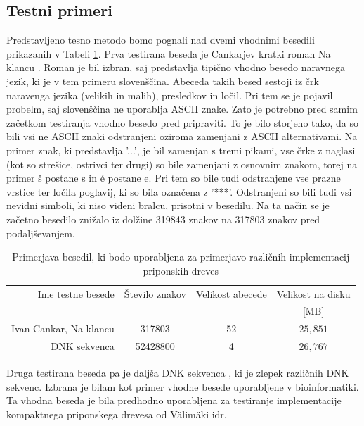 \subsection{Testni primeri}

Predstavljeno tesno metodo bomo pognali nad dvemi vhodnimi besedili prikazanih v Tabeli \ref{tab:besedila}. Prva testirana beseda je Cankarjev kratki roman Na klancu \cite{podatkiNaKlancu}. Roman je bil izbran, saj predstavlja tipično vhodno besedo naravnega jezik, ki je v tem primeru slovenščina. Abeceda takih besed sestoji iz črk naravenga jezika (velikih in malih), presledkov in ločil. Pri tem se je pojavil probelm, saj slovenščina ne uporablja ASCII znake. Zato je potrebno pred samim začetkom testiranja vhodno besedo pred pripraviti. To je bilo storjeno tako, da so bili vsi ne ASCII znaki odstranjeni oziroma zamenjani z ASCII alternativami. Na primer znak, ki predstavlja '...', je bil zamenjan s tremi pikami, vse črke z naglasi (kot so strešice, ostrivci ter drugi) so bile zamenjani z osnovnim znakom, torej na primer š postane s in é postane e. Pri tem so bile tudi odstranjene vse prazne vrstice ter ločila poglavij, ki so bila označena z '***'. Odstranjeni so bili tudi vsi nevidni simboli, ki niso videni bralcu, prisotni v besedilu. Na ta način se je začetno besedilo znižalo iz dolžine 319843 znakov na 317803 znakov pred podaljševanjem.

\begin{table}[htb]
    \caption{Primerjava besedil, ki bodo uporabljena za primerjavo različnih implementacij priponskih dreves}
    \label{tab:besedila}
    \centering
    \begin{tabular}{rccc}
        Ime testne besede& Število znakov & Velikost abecede & Velikost na disku \\
        &  &   & [MB]\\
         \hline
        Ivan Cankar, Na klancu \cite{podatkiNaKlancu}& 317803 & 52 & $25,851$ \\
        DNK sekvenca \cite{podatki}&  52428800& 4 & $26,767$ \\
    \end{tabular}    
\end{table}

Druga testirana beseda pa je daljša DNK sekvenca \cite{podatki}, ki je zlepek različnih DNK sekvenc. Izbrana je bilam kot primer vhodne besede uporabljene v bioinformatiki. Ta vhodna beseda je bila predhodno uporabljena za testiranje implementacije kompaktnega priponskega drevesa od Välimäki idr. \cite{Valimaki2007}

